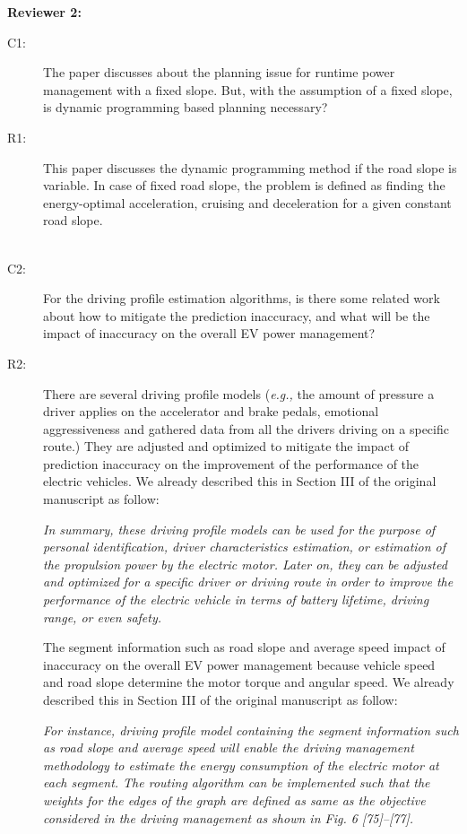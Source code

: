 \documentclass[onecolumn]{IEEEconf}
\begin{document}
\begin{description}
\end{description}

\pagebreak


\textbf{Reviewer 2:}
\begin{description}
\item [C1: ] The paper discusses about the planning issue for runtime power management with a fixed slope. But, with the assumption of a fixed slope, is dynamic programming based planning necessary?
\item [R1: ] This paper discusses the dynamic programming method if the road slope is variable. In case of fixed road slope, the problem is defined as  finding the energy-optimal acceleration, cruising and deceleration for a given constant road slope.\\
~\\

\item [C2: ] For the driving profile estimation algorithms, is there some related work about how to mitigate the prediction inaccuracy, and what will be the impact of inaccuracy on the overall EV power management?
\item [R2: ] There are several driving profile models (\textit{e.g.,} the amount of pressure a driver applies on the accelerator and brake pedals, emotional aggressiveness and gathered data from all the drivers driving on a specific route.) They are adjusted and optimized to mitigate the impact of prediction inaccuracy on the improvement of the performance of the electric vehicles. We already described this in Section III of the original manuscript as follow: 

\textit{In summary, these driving profile models can be used for the purpose of personal identification, driver characteristics estimation, or estimation of the propulsion power by the electric motor. Later on, they can be adjusted and optimized for a specific driver or driving route in order to improve the performance of the electric vehicle in terms of battery lifetime, driving range, or even safety.} 

The segment information such as road slope and average speed impact of inaccuracy on the overall EV power management because vehicle speed and road slope determine the motor torque and angular speed. We already described this in Section III of the original manuscript as follow:  

\textit{For instance, driving profile model containing the segment information such as road slope and average speed will enable the driving management methodology to estimate the energy consumption of the electric motor at each segment. The routing algorithm can be implemented such that the weights for the edges of the graph are defined as same as the objective considered in the driving management as shown in Fig. 6 [75]--[77].}
\\
~\\


\end{description}
\end{document}
